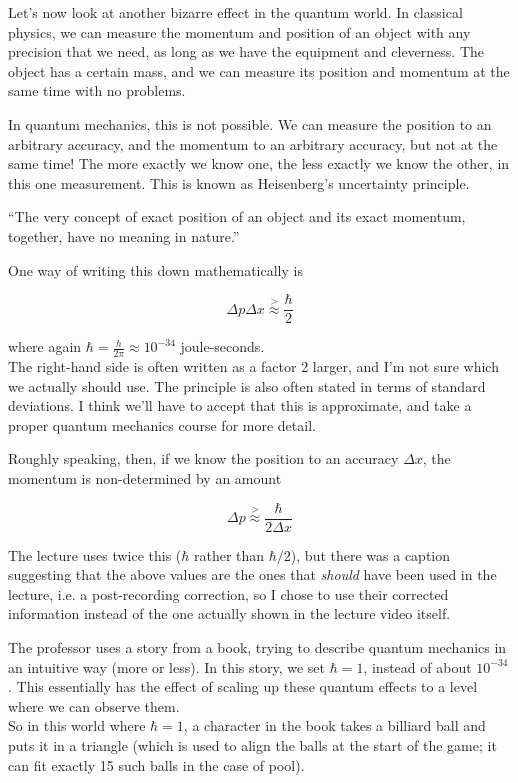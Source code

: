 \documentclass[8.01x]{subfiles}
\begin{document}
Let's now look at another bizarre effect in the quantum world. In classical physics, we can measure the momentum and position of an object with any precision that we need, as long as we have the equipment and cleverness. The object has a certain mass, and we can measure its position and momentum at the same time with no problems.

In quantum mechanics, this is not possible. We can measure the position to an arbitrary accuracy, and the momentum to an arbitrary accuracy, but not at the same time! The more exactly we know one, the less exactly we know the other, in this one measurement. This is known as Heisenberg's uncertainty principle.

``The very concept of exact position of an object and its exact momentum, together, have no meaning in nature.''

One way of writing this down mathematically is

\begin{equation}
\Delta p \Delta x \overset{>}{\approx} \frac{\hbar}{2}
\end{equation}

where again $\displaystyle \hbar = \frac{h}{2\pi} \approx 10^{-34}$ joule-seconds.\\
The right-hand side is often written as a factor 2 larger, and I'm not sure which we actually should use. The principle is also often stated in terms of standard deviations. I think we'll have to accept that this is approximate, and take a proper quantum mechanics course for more detail.

Roughly speaking, then, if we know the position to an accuracy $\Delta x$, the momentum is non-determined by an amount

\begin{equation}
\Delta p \overset{>}{\approx} \frac{\hbar}{2 \Delta x}
\end{equation}

The lecture uses twice this ($\hbar$ rather than $\hbar/2$), but there was a caption suggesting that the above values are the ones that \emph{should} have been used in the lecture, i.e. a post-recording correction, so I chose to use their corrected information instead of the one actually shown in the lecture video itself.

The professor uses a story from a book, trying to describe quantum mechanics in an intuitive way (more or less). In this story, we set $\hbar = 1$, instead of about $10^{-34}$. This essentially has the effect of scaling up these quantum effects to a level where we can observe them.\\
So in this world where $\hbar = 1$, a character in the book takes a billiard ball and puts it in a triangle (which is used to align the balls at the start of the game; it can fit exactly 15 such balls in the case of pool).
\end{document}
